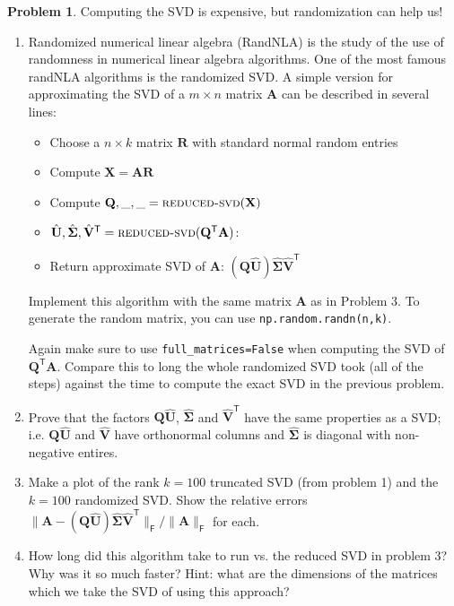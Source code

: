 \documentclass[12pt]{article}
\theoremstyle{definition}
\newtheorem{problem}{Problem}
\renewcommand{\vec}{\mathbf}
\newcommand{\T}{\mathsf{T}}
\newcommand{\F}{\mathsf{F}}
\begin{document}
\begin{problem}
    Computing the SVD is expensive, but randomization can help us!
    \begin{enumerate}
        \item Randomized numerical linear algebra (RandNLA) is the study of the use of randomness in numerical linear algebra algorithms. 
            One of the most famous randNLA algorithms is the randomized SVD.
            A simple version for approximating the SVD of a $m\times n$ matrix $\vec{A}$ can be described in several lines:
            \begin{itemize}
                \item Choose a $n\times k$ matrix $\vec{R}$ with standard normal random entries
                \item Compute $\vec{X} = \vec{A} \vec{R}$
                \item Compute $\vec{Q},\_,\_ = \textsc{reduced-svd}(\vec{X})$
                \item 
                    $\hat{\vec{U}}, \hat{\vec{\Sigma}}, \hat{\vec{V}}^\T = \textsc{reduced-svd}(\vec{Q}^\T \vec{A})$: 
                \item Return approximate SVD of $\vec{A}$: $(\vec{Q} \hat{\vec{U}}) \hat{\vec{\Sigma}} \hat{\vec{V}}^\T$  
            \end{itemize}

            Implement this algorithm with the same matrix $\vec{A}$ as in Problem 3.
            To generate the random matrix, you can use \lstinline{np.random.randn(n,k)}.


            Again make sure to use \lstinline{full_matrices=False} when computing the SVD of $\vec{Q}^\T \vec{A}$.
            Compare this to long the whole randomized SVD took (all of the steps) against the time to compute the exact SVD in the previous problem.
       
        \item Prove that the factors $\vec{Q}\hat{\vec{U}}$, $\hat{\vec{\Sigma}}$ and $\hat{\vec{V}}^\T$ have the same properties as a SVD; i.e. $\vec{Q}\hat{\vec{U}}$ and $\hat{\vec{V}}$ have orthonormal columns and $\hat{\vec{\Sigma}}$ is diagonal with non-negative entires.
        \item 
            Make a plot of the rank $k=100$ truncated SVD (from problem 1) and the $k=100$ randomized SVD.
            Show the relative errors $\|\vec{A} - (\vec{Q} \hat{\vec{U}})\hat{\vec{\Sigma}} \hat{\vec{V}}^\T \|_\F/\|\vec{A}\|_\F$ for each. 
        \item How long did this algorithm take to run vs. the reduced SVD in problem 3? Why was it so much faster? Hint: what are the dimensions of the matrices which we take the SVD of using this approach?

    \end{enumerate}
\end{problem}
\end{document}
